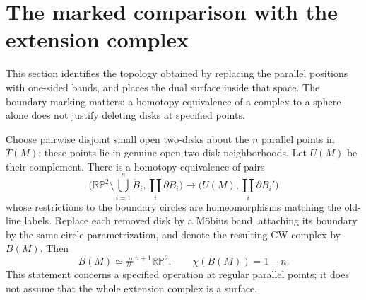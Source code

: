 \section{The marked comparison with the extension complex}
\label{sec:marked-comparison}
This section identifies the topology obtained by replacing the parallel
positions with one-sided bands, and places the dual surface inside that
space. The boundary marking matters: a homotopy equivalence of a complex
to a sphere alone does not justify deleting disks at specified points.

\begin{proposition}\label{prop:marked-punctures}

Choose pairwise disjoint small open two-disks about the $n$ parallel points
in $\overline T(M)$; these points lie in genuine open two-disk neighborhoods.
Let $U(M)$ be their complement. There is a homotopy equivalence of pairs
\[
 \bigl(\mathbb {RP}^2\setminus\textstyle\bigcup_{i=1}^n\mathring B_i,
       \coprod_i\partial B_i\bigr)
 \longrightarrow
 \bigl(U(M),\coprod_i\partial B_i'\bigr)
\]
whose restrictions to the boundary circles are homeomorphisms matching the
old-line labels. Replace each removed disk by a M\"obius band, attaching its
boundary by the same circle parametrization, and denote the resulting CW
complex by $B(M)$. Then
\[
 B(M)\simeq\#^{\,n+1}\mathbb {RP}^2,
 \qquad\chi(B(M))=1-n.
\]
This statement concerns a specified operation at regular parallel points;
it does not assume that the whole extension complex is a surface.
\end{proposition}
